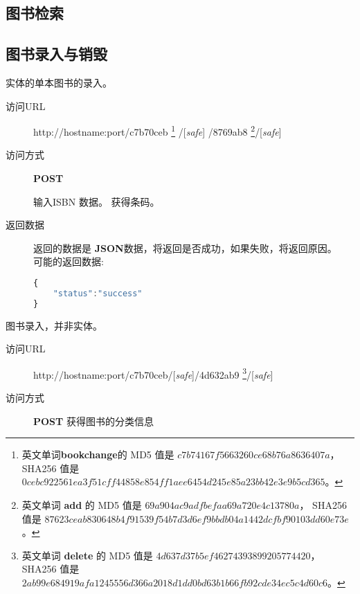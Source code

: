 \documentclass[UTF8]{article}
\def\safe{/[\textit{safe}]}
\def\POST{\colorbox[rgb]{0.77,0.53,0.97}{\textbf{POST}}}
\def\bfJSON{\textbf{JSON}}
\def\viaurl{\item[{\quad\colorbox[rgb]{0.47,0.88,0.89}{访问URL}}]}
\def\viareq#1{\item[{\quad\colorbox[rgb]{0.57,0.88,0.99}{访问方式}}] #1}
\def\rtdata{\item[{\quad\colorbox[rgb]{0.70,0.9,0.59}{返回数据}}]}
\begin{document}
        \subsection{图书检索}
        \subsection{图书录入与销毁}
        实体的单本图书的录入。
        \begin{description}
            \viaurl  http://hostname:port/c7b70ceb
            \footnote{
                英文单词\textbf{bookchange}的
                MD5 值是 $c7b74167f5663260ce68b76a8636407a $，
                SHA256 值是 $0cebc922561ea3f51cff44858e854ff1aee6454d245e85a23bb42e3e9b5cd365$。
            }
            \safe
            /8769ab8
            \footnote{
                英文单词 \textbf{add} 的
                MD5 值是 $69a904ac9adfbefaa69a720e4c13780a $，
                SHA256 值是 $87623ceab830648b4f91539f54b7d3d6ef9bbdb04a1442dcfbf90103dd60e73e$。
            }\safe
            
            \viareq{\POST}
            
             输入ISBN 数据。
             获得条码。
            \rtdata 返回的数据是 \bfJSON 数据，将返回是否成功，如果失败，将返回原因。
            \\ 可能的返回数据:
            \begin{lstlisting}[language=JavaScript]
{
    "status":"success"
}
            \end{lstlisting}
        \end{description}
        图书录入，并非实体。
        \begin{description}
        \viaurl http://hostname:port/c7b70ceb\safe/4d632ab9
        \footnote{
            英文单词 \textbf{delete} 的
            MD5 值是 $4d637d37b5ef46274393899205774420$，
            SHA256 值是 $2ab99e684919afa1245556d366a2018d1dd0bd63b1b66fb92cde34ec5c4d60c6$。
        }\safe
        \viareq{\POST}
         获得图书的分类信息
        
        \end{description}
\end{document}
